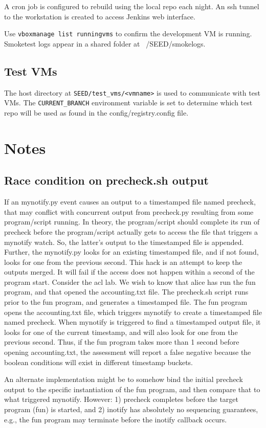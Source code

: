 \documentclass[12pt]{article}
\begin{document}
A cron job is configured to rebuild using the local repo each night.
An ssh tunnel to the workstation is created to access Jenkins web interface.

Use {\tt vboxmanage list runningvms} to confirm the development VM is running.
Smoketest logs appear in a shared folder at ~/SEED/smokelogs.

\subsection{Test VMs}
The host directory at {\tt SEED/test\_vms/<vmname>} is used to communicate with test VMs.
The {\tt CURRENT\_BRANCH} environment variable is set to determine which test repo
will be used as found in the config/registry.config file.

\section {Notes}
\subsection {Race condition on precheck.sh output}
If an mynotify.py event causes an output to a timestamped file named precheck, that may conflict with
concurrent output from precheck.py resulting from some program/script running.  In 
theory, the program/script should complete its run of precheck before the program/script
actually gets to access the file that triggers a mynotify watch.  So, the latter's output
to the timestamped file is appended.  Further, the mynotify.py looks for an existing timestamped
file, and if not found, looks for one from the previous second.  This hack is an attempt to
keep the outputs merged.  It will fail if the access does not happen within a second of the
program start.  Consider the acl lab.  We wish to know that alice has run the fun program,
and that opened the accounting.txt file.  The precheck.sh script runs prior to the fun program,
and generates a timestamped file.  The fun program opens the accounting.txt file, which triggers
mynotify to create a timestamped file named precheck.  When mynotify is triggered to find a timestamped
output file, it looks for one of the current timestamp, and will also look for one from the previous second.
Thus, if the fun program takes more than 1 second before opening accounting.txt, the assessment will report
a false negative because the boolean conditions will exist in different timestamp buckets.

An alternate implementation might be to somehow bind the initial precheck output to the specific instantiation of
the fun program, and then compare that to what triggered mynotify.  However: 1) precheck completes before the target
program (fun) is started, and 2) inotify has absolutely no sequencing guarantees, e.g., the fun program may terminate
before the inotify callback occurs.
\end{document}
